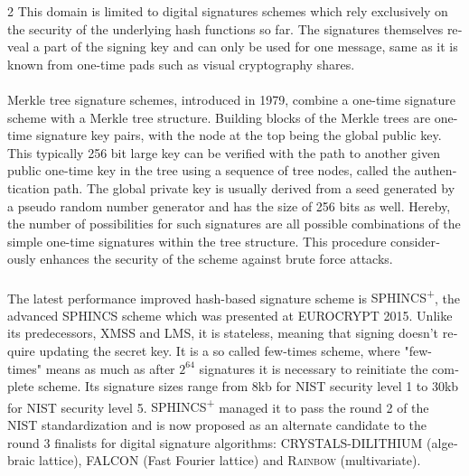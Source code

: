 \documentclass[a4paper,11pt]{article}
\begin{document}
\begin{otherlanguage}{english}
\begin{multicols}{2}
This domain is limited to digital signatures schemes which rely exclusively on the security of the underlying hash functions so far. The signatures themselves reveal a part of the signing key and can only be used for one message, same as it is known from one-time pads such as visual cryptography shares. \\
\\
Merkle tree signature schemes, introduced in 1979, combine a one-time signature scheme with a Merkle tree structure. Building blocks of the Merkle trees are one-time signature key pairs, with the node at the top being the global public key. This typically 256 bit large key can be verified with the path to another given public one-time key in the tree using a sequence of tree nodes, called the authentication path. The global private key is usually derived from a seed generated by a pseudo random number generator and has the size of 256 bits as well.
Hereby, the number of possibilities for such signatures are all possible combinations of the simple one-time signatures within the tree structure. This procedure considerously enhances the security of the scheme against brute force attacks. \\
\\
The latest performance improved hash-based signature scheme is \textsc{SPHINCS\textsuperscript{+}}\cite{SPH+}, the advanced \textsc{SPHINCS} \cite{SPH} scheme which was presented at EUROCRYPT 2015. Unlike its predecessors, XMSS and LMS, it is stateless, meaning that signing doesn't require updating the secret key. It is a so called few-times scheme, where "few-times" means as much as after $2^{64}$ signatures it is necessary to reinitiate the complete scheme. Its signature sizes range from 8kb for NIST security level 1 to 30kb for NIST security level 5. \textsc{SPHINCS\textsuperscript{+}} managed it to pass the round 2 of the NIST standardization and is now proposed as an alternate candidate to the round 3 finalists for digital signature algorithms: \textsc{CRYSTALS-DILITHIUM} (algebraic lattice), \textsc{FALCON} (Fast Fourier lattice) and \textsc{Rainbow} (multivariate).



\end{multicols}
\end{otherlanguage}
\end{document}
